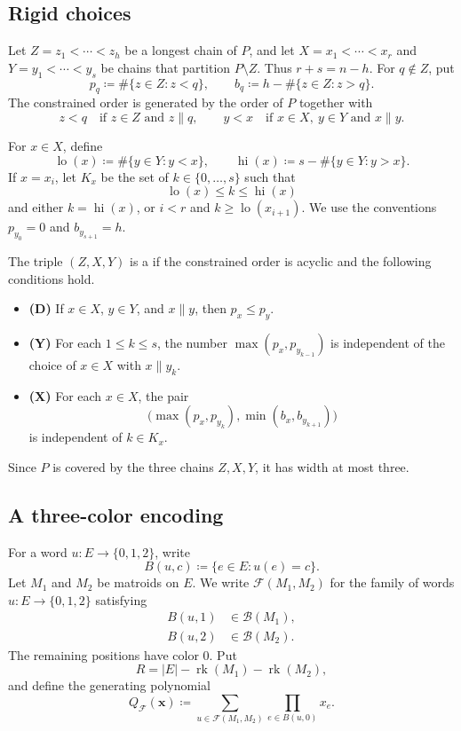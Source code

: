 \subsection[rigidChoices]{Rigid choices}

Let $Z=z_1<\dotsm<z_h$ be a longest chain of $P$, and let
$X=x_1<\dotsm<x_r$ and $Y=y_1<\dotsm<y_s$ be chains that partition
$P\setminus Z$. Thus $r+s=n-h$. For $q\notin Z$, put
\[
 p_q\coloneqq\#\{z\in Z:z<q\},
 \qquad
 b_q\coloneqq h-\#\{z\in Z:z>q\}.
\]
The constrained order is generated by the order of $P$ together with
\[
 z<q\quad\text{if }z\in Z\text{ and }z\parallel q,
 \qquad
 y<x\quad\text{if }x\in X,\ y\in Y\text{ and }x\parallel y.
\]

For $x\in X$, define
\[
 \operatorname{lo}(x)\coloneqq\#\{y\in Y:y<x\},
 \qquad
 \operatorname{hi}(x)\coloneqq s-\#\{y\in Y:y>x\}.
\]
If $x=x_i$, let $K_x$ be the set of $k\in\{0,\dotsc,s\}$ such that
\[
 \operatorname{lo}(x)\leq k\leq\operatorname{hi}(x)
\]
and either $k=\operatorname{hi}(x)$, or $i<r$ and
$k\geq\operatorname{lo}(x_{i+1})$. We use the conventions
$p_{y_0}=0$ and $b_{y_{s+1}}=h$.

\begin{definition}
The triple $(Z,X,Y)$ is a  if the constrained order is
acyclic and the following conditions hold.
\begin{itemize}
\item \textbf{(D)} If $x\in X$, $y\in Y$, and $x\parallel y$, then
$p_x\leq p_y$.
\item \textbf{(Y)} For each $1\leq k\leq s$, the number
$\max(p_x,p_{y_{k-1}})$ is independent of the choice of
$x\in X$ with $x\parallel y_k$.
\item \textbf{(X)} For each $x\in X$, the pair
\[
 \bigl(\max(p_x,p_{y_k}),\min(b_x,b_{y_{k+1}})\bigr)
\]
is independent of $k\in K_x$.
\end{itemize}
\end{definition}

Since $P$ is covered by the three chains $Z,X,Y$, it has width at most three.

\subsection[threeColorEncoding]{A three-color encoding}

For a word $u:E\to\{0,1,2\}$, write
\[
 B(u,c)\coloneqq\{e\in E:u(e)=c\}.
\]
Let $M_1$ and $M_2$ be matroids on $E$. We write $\mathcal F(M_1,M_2)$
for the family of words $u:E\to\{0,1,2\}$ satisfying
\[
 \begin{aligned}
 B(u,1)&\in\mathcal B(M_1),\\
 B(u,2)&\in\mathcal B(M_2).
 \end{aligned}
\]
The remaining positions have color $0$. Put
\[
 R=|E|-\operatorname{rk}(M_1)-\operatorname{rk}(M_2),
\]
and define the generating polynomial
\[
 Q_{\mathcal F}(\mathbf x)\coloneqq
 \sum_{u\in\mathcal F(M_1,M_2)}
 \prod_{e\in B(u,0)}x_e.
\]

